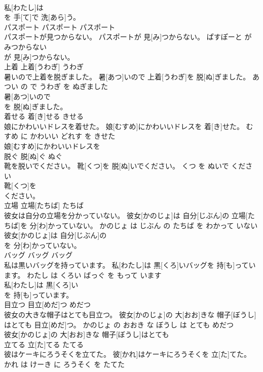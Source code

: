 \documentclass[8pt]{extreport}
\begin{document}
\begin{CJK}{UTF8}{min}
\\	私[わたし]は
\\	を 手[て]で 洗[あら]う。		
\\	パスポート	パスポート	パスポート	
\\	パスポートが見つからない。	パスポートが 見[み]つからない。	ぱすぽーと が みつからない	
\\	が 見[み]つからない。		
\\	上着	上着[うわぎ]	うわぎ	
\\	暑いので上着を脱ぎました。	暑[あつ]いので 上着[うわぎ]を 脱[ぬ]ぎました。	あつい の で うわぎ を ぬぎました	
\\	暑[あつ]いので
\\	を 脱[ぬ]ぎました。		
\\	着せる	着[き]せる	きせる	
\\	娘にかわいいドレスを着せた。	娘[むすめ]にかわいいドレスを 着[き]せた。	むすめ に かわいい どれす を きせた	
\\	娘[むすめ]にかわいいドレスを
\\	脱ぐ	脱[ぬ]ぐ	ぬぐ	
\\	靴を脱いでください。	靴[くつ]を 脱[ぬ]いでください。	くつ を ぬいで ください	
\\	靴[くつ]を
\\	ください。		
\\	立場	立場[たちば]	たちば	
\\	彼女は自分の立場を分かっていない。	彼女[かのじょ]は 自分[じぶん]の 立場[たちば]を 分[わ]かっていない。	かのじょ は じぶん の たちば を わかって いない	
\\	彼女[かのじょ]は 自分[じぶん]の
\\	を 分[わ]かっていない。		
\\	バッグ	バッグ	バッグ	
\\	私は黒いバッグを持っています。	私[わたし]は 黒[くろ]いバッグを 持[も]っています。	わたし は くろい ばっぐ を もって います	
\\	私[わたし]は 黒[くろ]い
\\	を 持[も]っています。		
\\	目立つ	目立[めだ]つ	めだつ	
\\	彼女の大きな帽子はとても目立つ。	彼女[かのじょ]の 大[おお]きな 帽子[ぼうし]はとても 目立[めだ]つ。	かのじょ の おおき な ぼうし は とても めだつ	
\\	彼女[かのじょ]の 大[おお]きな 帽子[ぼうし]はとても
\\	立てる	立[た]てる	たてる	
\\	彼はケーキにろうそくを立てた。	彼[かれ]はケーキにろうそくを 立[た]てた。	かれ は けーき に ろうそく を たてた	

\end{CJK}
\end{document}
